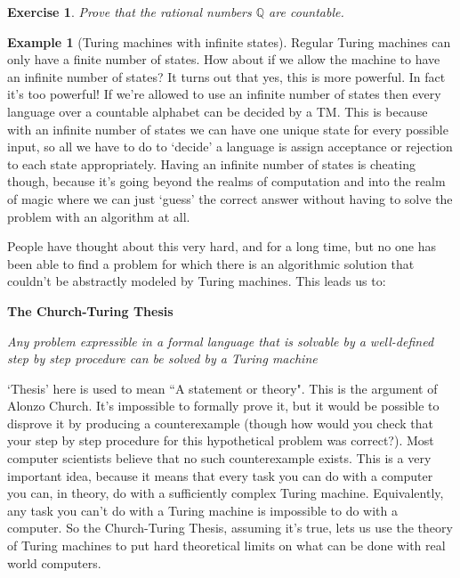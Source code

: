 \documentclass{article}
\theoremstyle{plain}
\newtheorem{exercise}[theorem]{Exercise}{\bfseries}{\upshape}
\theoremstyle{definition}
\newtheorem{example}[theorem]{Example}{\bfseries}{\upshape}
\begin{document}
\begin{exercise}
Prove that the rational numbers $\mathbb{Q}$ are countable.
\end{exercise}

\begin{example}[Turing machines with infinite states] Regular Turing machines can only have a finite number of states. How about if we allow the machine to have an infinite number of states? It turns out that yes, this is more powerful. In fact it's too powerful! If we're allowed to use an infinite number of states then every language over a countable alphabet can be decided by a TM. This is because with an infinite number of states we can have one unique state for every possible input, so all we have to do to `decide' a language is assign acceptance or rejection to each state appropriately. Having an infinite number of states is cheating though, because it's going beyond the realms of computation and into the realm of magic where we can just `guess' the correct answer without having to solve the problem with an algorithm at all.   
\end{example}

People have thought about this very hard, and for a long time, but no one has been able to find a problem for which there is an algorithmic solution that couldn't be abstractly modeled by Turing machines. This leads us to:
\newline
\newline

\begin{centering} \textbf{The Church-Turing Thesis}


\emph{Any problem expressible in a formal language that is solvable by a well-defined step by step procedure can be solved by a Turing machine} \end{centering}
\newline

`Thesis' here is used to mean ``A statement or theory". This is the argument of Alonzo Church. It's impossible to formally prove it, but it would be possible to disprove it by producing a counterexample (though how would you check that your step by step procedure for this hypothetical problem was correct?). Most computer scientists believe that no such counterexample exists. This is a very important idea, because it means that every task you can do with a computer you can, in theory, do with a sufficiently complex Turing machine. Equivalently, any task you can't do with a Turing machine is impossible to do with a computer. So the Church-Turing Thesis, assuming it's true, lets us use the theory of Turing machines to put hard theoretical limits on what can be done with real world computers.
\end{document}
